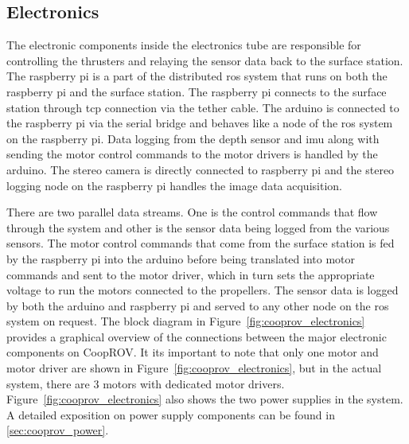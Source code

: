 \documentclass {udthesis}
\begin{document}
\subsection{Electronics}

The electronic components inside the electronics tube are responsible for controlling the thrusters and relaying the sensor data back to the surface station. The raspberry pi is a part of the distributed \gls{ros} system that runs on both the raspberry pi and the surface station. The raspberry pi connects to the surface station through \gls{tcp} connection via the tether cable. The arduino is connected to the raspberry pi via the serial bridge and behaves like a node of the \gls{ros} system on the raspberry pi. Data logging from the depth sensor and \gls{imu} along with sending the motor control commands to the motor drivers is handled by the arduino. The stereo camera is directly connected to raspberry pi and the stereo logging node on the raspberry pi handles the image data acquisition.

There are two parallel data streams. One is the control commands that flow through the system and other is the sensor data being logged from the various sensors. The motor control commands that come from the surface station is fed by the raspberry pi into the arduino before being translated into motor commands and sent to the motor driver, which in turn sets the appropriate voltage to run the motors connected to the propellers. The sensor data is logged by both the arduino and raspberry pi and served to any other node on the \gls{ros} system on request. The block diagram in Figure~\ref{fig:cooprov_electronics} provides a graphical overview of the connections between the major electronic components on CoopROV. It its important to note that only one motor and motor driver are shown in Figure~\ref{fig:cooprov_electronics}, but in the actual system, there are 3 motors with dedicated motor drivers. Figure~\ref{fig:cooprov_electronics} also shows the two power supplies in the system. A detailed exposition on 
power supply components can be found in \ref{sec:cooprov_power}.
\end{document}

